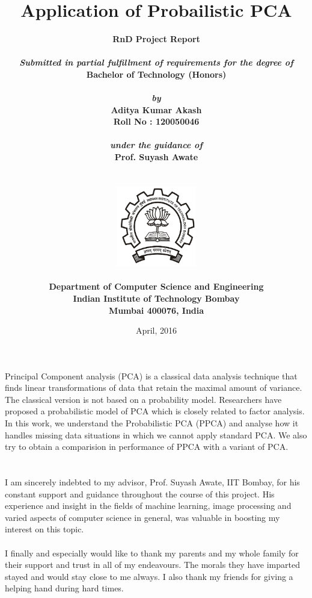 \documentclass[12pt]{report}
\title{\textbf{Application of Probailistic PCA}}
\author{
		\bf{RnD Project Report}\\
        \\
        \emph{Submitted in partial fulfillment of requirements for the degree of}\\
        \bf{Bachelor of Technology (Honors)}\\
        \\
        \emph{by}\\
		\bf{Aditya Kumar Akash}\\
        \bf{Roll No : 120050046}\\
        \\
        \emph{under the guidance of}\\
		\bf{Prof. Suyash Awate}\\
        \\\\
        \includegraphics[height=3.5cm]{./iitb_logo.jpg}\\
        \\
		\bf{Department of Computer Science and Engineering}\\
        \bf{Indian Institute of Technology Bombay}\\
        \bf{Mumbai 400076, India}\\
}
\date{April, 2016}
\makeatletter
\newcommand\frontmatter{%
  \cleardoublepage
  \pagenumbering{roman}}
\newcommand\mainmatter{%
  \cleardoublepage
  \pagenumbering{arabic}}
\makeatother
\begin{document}
\frontmatter
\maketitle
\pagebreak
\tableofcontents
\pagebreak

\chapter*{}
Principal Component analysis (PCA) is a classical data analysis technique that finds linear transformations of data that retain the maximal amount of variance. The classical version is not based on a probability model. Researchers have proposed a probabilistic model of PCA which is closely related to factor analysis. In this work, we understand the Probabilistic PCA (PPCA) and analyse how it handles missing data situations in which we cannot apply standard PCA. We also try to obtain a comparision in performance of PPCA with a variant of PCA.

\pagebreak

\chapter*{}
I am sincerely indebted to my advisor, Prof. Suyash Awate, IIT Bombay, for his constant support and guidance throughout the course of this project. His experience and insight in the fields of machine learning, image processing and varied aspects of computer science in general, was valuable in boosting my interest on this topic. \\\\
I finally and especially would like to thank my parents and my whole family for their support and trust in all of my endeavours. The morals they have imparted stayed and would stay close to me always. I also thank my friends for giving a helping hand during hard times.
\pagebreak


\mainmatter






	
\newpage
\end{document}
